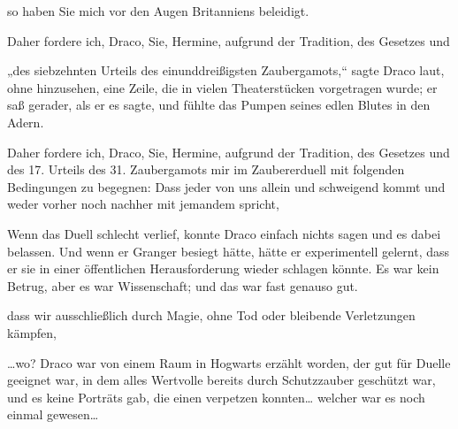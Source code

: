 \begin{writtenNote}
so haben Sie mich vor den Augen Britanniens beleidigt.

Daher fordere ich, Draco, Sie, Hermine, aufgrund der Tradition, des Gesetzes und
\end{writtenNote}

„des siebzehnten Urteils des einunddreißigsten Zaubergamots,“ sagte Draco laut, ohne hinzusehen, eine Zeile, die in vielen Theaterstücken vorgetragen wurde; er saß gerader, als er es sagte, und fühlte das Pumpen seines edlen Blutes in den Adern.

\begin{writtenNote}
Daher fordere ich, Draco, Sie, Hermine, aufgrund der Tradition, des Gesetzes und des 17. Urteils des 31. Zaubergamots mir im Zaubererduell mit folgenden Bedingungen zu begegnen: Dass jeder von uns allein und schweigend kommt und weder vorher noch nachher mit jemandem spricht,
\end{writtenNote}

Wenn das Duell schlecht verlief, konnte Draco einfach nichts sagen und es dabei belassen. Und wenn er Granger besiegt hätte, hätte er experimentell gelernt, dass er sie in einer öffentlichen Herausforderung wieder schlagen könnte. Es war kein Betrug, aber es war Wissenschaft; und das war fast genauso gut.

\begin{writtenNote}
dass wir ausschließlich durch Magie, ohne Tod oder bleibende Verletzungen kämpfen,
\end{writtenNote}

…wo? Draco war von einem Raum in Hogwarts erzählt worden, der gut für Duelle geeignet war, in dem alles Wertvolle bereits durch Schutzzauber geschützt war, und es keine Porträts gab, die einen verpetzen konnten… welcher war es noch einmal gewesen…

